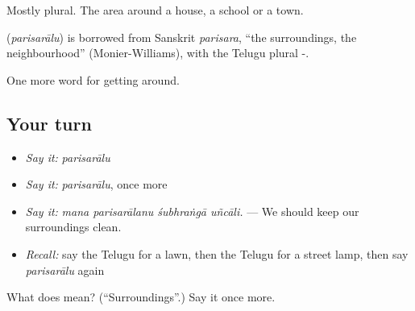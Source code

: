 Mostly plural. The area around a house, a school or a town.

\begin{cousinweb}
\textbf{} (\emph{parisarālu}) is borrowed from Sanskrit \emph{parisara}, \textquotedblleft{}the surroundings, the neighbourhood\textquotedblright{} (Monier-Williams), with the Telugu plural -.
\end{cousinweb}

\begin{grammarlens}[title={What you've built}]
One more word for getting around.
\end{grammarlens}

\subsection*{Your turn}
\begin{itemize}
\raggedright
  \item \emph{Say it:} \emph{parisarālu}
  \item \emph{Say it:} \emph{parisarālu}, once more
  \item \emph{Say it:} \emph{mana parisarālanu śubhraṅgā uñcāli.} — We should keep our surroundings clean.
  \item \emph{Recall:} say the Telugu for a lawn, then the Telugu for a street lamp, then say \emph{parisarālu} again
\end{itemize}

\begin{tcolorbox}[breakable,colback=teal!4,colframe=teal!35!black,title={Before you move on}]
What does  mean? (\textquotedblleft{}Surroundings\textquotedblright{}.) Say it once more.
\end{tcolorbox}
